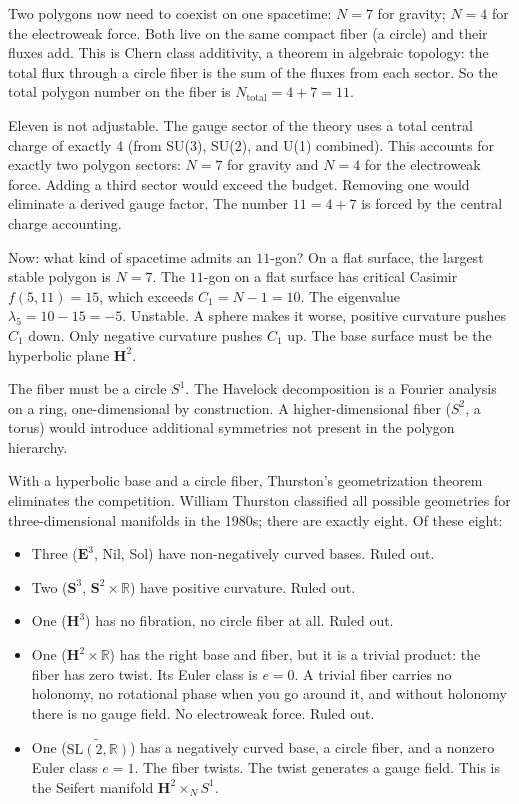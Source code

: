 Two polygons now need to coexist on one spacetime: $N = 7$ for
gravity; $N = 4$ for the electroweak force. Both live on the same
compact fiber (a circle) and their fluxes add. This is Chern class
additivity, a theorem in algebraic topology: the total flux through a
circle fiber is the sum of the fluxes from each sector. So the total
polygon number on the fiber is $N_{\text{total}} = 4 + 7 = 11$.

Eleven is not adjustable. The gauge sector of the theory uses
a total central charge of exactly 4 (from SU(3), SU(2), and U(1)
combined). This accounts for exactly two polygon sectors:
$N = 7$ for gravity and $N = 4$ for the electroweak force.
Adding a third sector would exceed the budget. Removing one
would eliminate a derived gauge factor. The number $11 = 4 + 7$
is forced by the central charge accounting.

Now: what kind of spacetime admits an $11$-gon? On a flat surface, the
largest stable polygon is $N = 7$. The $11$-gon on a flat surface has
critical Casimir $f(5, 11) = 15$, which exceeds $C_1 = N - 1 = 10$.
The eigenvalue $\lambda_5 = 10 - 15 = -5$. Unstable. A sphere makes
it worse, positive curvature pushes $C_1$ down. Only negative
curvature pushes $C_1$ up. The base surface must be the hyperbolic
plane $\mathbf{H}^2$.

The fiber must be a circle $S^1$. The Havelock decomposition is a
Fourier analysis on a ring, one-dimensional by construction. A
higher-dimensional fiber ($S^2$, a torus) would introduce additional
symmetries not present in the polygon hierarchy.

With a hyperbolic base and a circle fiber, Thurston's geometrization
theorem eliminates the competition. William Thurston classified all
possible geometries for three-dimensional manifolds in the 1980s; there
are exactly eight. Of these eight:
\begin{itemize}
\item Three ($\mathbf{E}^3$, Nil, Sol) have non-negatively curved
  bases. Ruled out.
\item Two ($\mathbf{S}^3$, $\mathbf{S}^2 \times \mathbb{R}$) have
  positive curvature. Ruled out.
\item One ($\mathbf{H}^3$) has no fibration, no circle fiber at all.
  Ruled out.
\item One ($\mathbf{H}^2 \times \mathbb{R}$) has the right base and
  fiber, but it is a trivial product: the fiber has zero twist. Its
  Euler class is $e = 0$. A trivial fiber carries no holonomy, no
  rotational phase when you go around it, and without holonomy there
  is no gauge field. No electroweak force. Ruled out.
\item One ($\widetilde{\mathrm{SL}(2,\mathbb{R})}$) has a negatively
  curved base, a circle fiber, and a nonzero Euler class $e = 1$. The
  fiber twists. The twist generates a gauge field. This is the Seifert
  manifold $\mathbf{H}^2 \times_N S^1$.
\end{itemize}

